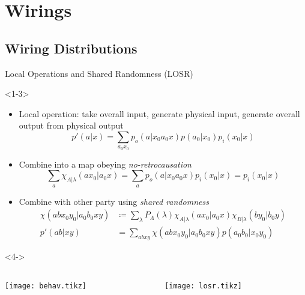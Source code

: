 \documentclass[xcolor=dvipsnames]{beamer}
\newcommand{\?}{\mathrel{?}} %
\begin{document}
\section{Wirings}

\subsection{Wiring Distributions}

\begin{frame}{Local Operations and Shared Randomness\setcounter{footnote}{0} (LOSR)}
  \begin{onlyenv}<1-3>
    \begin{itemize}[<+->]
      \item Local operation: take overall input, generate physical input, generate overall output from physical output
        \[ p'(a|x) = \sum_{a_0 x_0} p_o(a|x_0 a_0 x) p(a_0|x_0) p_i(x_0|x) \]
      \item Combine into a map obeying \emph{no-retrocausation}
        \[ \sum_a \chi_{A|\lambda}(ax_0|a_0x) = \sum_a p_o(a|x_0 a_0 x) p_i(x_0|x) = p_i(x_0|x) \]
      \item Combine with other party using \emph{shared randomness}
        \begin{align*}
          \chi(abx_0y_0|a_0b_0xy) &\coloneqq \sum_{\lambda} P_{\Lambda}(\lambda) \chi_{A|\lambda}(ax_0|a_0x) \chi_{B|\lambda}(by_0|b_0y) \\
          p'(ab|xy) &= \sum_{abxy} \chi(abx_0y_0|a_0b_0xy) p(a_0b_0|x_0y_0)
        \end{align*}
    \end{itemize}
  \end{onlyenv}
  \begin{onlyenv}<4->
    \begin{columns}
      \begin{column}[c]{0.3\linewidth}
        \centering
        \texttt{[image: behav.tikz]}
      \end{column}
      \begin{column}[c]{0.7\linewidth}
        \centering
        \texttt{[image: losr.tikz]}
      \end{column}
    \end{columns}
  \end{onlyenv}
\end{frame}
\end{document}
